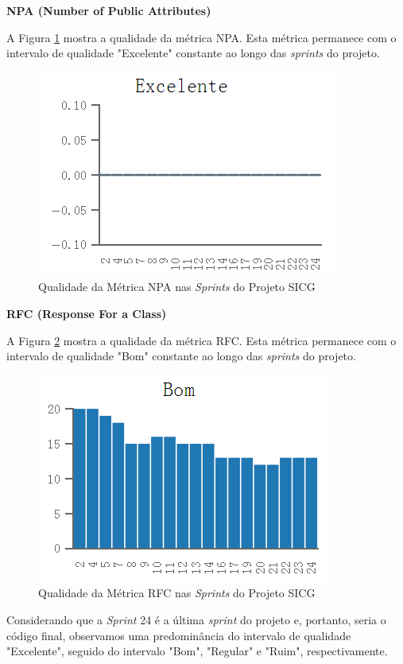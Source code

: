 \textbf{NPA (Number of Public Attributes)} 

A Figura \ref{npa} mostra a qualidade da métrica NPA. Esta métrica permanece com o intervalo de qualidade "Excelente" constante ao longo das \textit{sprints} do projeto.

\begin{figure}[H]
		\centering
			\includegraphics[scale=1.0]{figuras/npa.png}
		\caption{Qualidade da Métrica NPA nas \textit{Sprints} do Projeto SICG}
		\label{npa}
\end{figure}

\textbf{RFC (Response For a Class)} 

A Figura \ref{rfc} mostra a qualidade da métrica RFC. Esta métrica permanece com o intervalo de qualidade "Bom" constante ao longo das \textit{sprints} do projeto.

\begin{figure}[H]
		\centering
			\includegraphics[scale=1.0]{figuras/rfc.png}
		\caption{Qualidade da Métrica RFC nas \textit{Sprints} do Projeto SICG}
		\label{rfc}
\end{figure}

Considerando que a \textit{Sprint} 24 é a última \textit{sprint} do projeto e, portanto, seria o código final, observamos uma predominância do intervalo de qualidade "Excelente", seguido do intervalo "Bom", "Regular" e "Ruim", respectivamente. 


